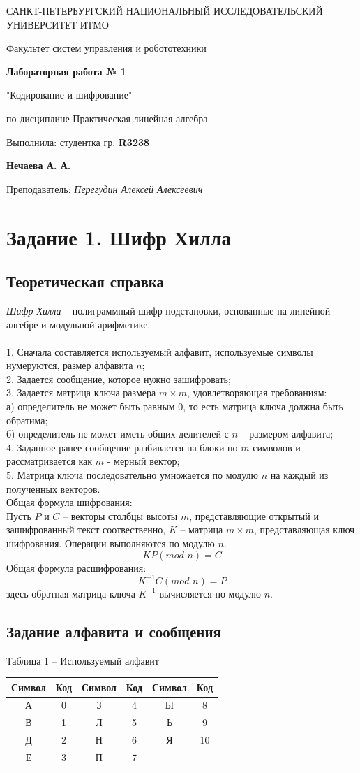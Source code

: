 \documentclass[a5paper, 10pt]{article}
\theoremstyle{definition}
\theoremstyle{plain}
\theoremstyle{remark}
\newcommand*{\titlePage}{
	\thispagestyle{title}
	\begingroup
	\begin{center}
		\vspace*{6ex}
		
		{\small
			САНКТ-ПЕТЕРБУРГСКИЙ НАЦИОНАЛЬНЫЙ ИССЛЕДОВАТЕЛЬСКИЙ УНИВЕРСИТЕТ ИТМО	
		}
		
		\vspace*{2ex}
		
		{\normalsize
			Факультет систем управления и робототехники
		}
		
		\vspace*{15ex}
		
		{\Large \bfseries 
			Лабораторная работа № 1
		}
\vspace*{2ex}
	{\Large \bfseries 
			
"Кодирование и шифрование"
		}
\vspace*{2ex}
		
		{\normalsize
			по дисциплине Практическая линейная алгебра
		}

	\end{center}
	\vspace*{20ex}
	\begin{flushright}
		{\large 
			\underline{Выполнила}: студентка гр. \textbf{R3238}\\
			\begin{flushright}
				\textbf{Нечаева А. А.}\\
			\end{flushright}
		}
		
		\vspace*{5ex}
		
		{\large 
			\underline{Преподаватель}: \textit{Перегудин Алексей Алексеевич}
		}
	\end{flushright}	
	\newpage
	\setcounter{page}{1}
	\endgroup}
\begin{document}
	\titlePage
	\pagestyle{style}
\newpage

\section{Задание 1. Шифр Хилла}
\subsection{Теоретическая справка}
\textit{Шифр Хилла} -- полиграммный шифр подстановки, основанные на линейной алгебре и модульной арифметике.\\\\
1. Сначала составляется используемый алфавит, используемые символы нумеруются, размер алфавита $n$;\\
2. Задается сообщение, которое нужно зашифровать;\\
3. Задается матрица ключа размера $m \times m$, удовлетворяющая требованиям: \\
\indent    а) определитель не может быть равным 0, то есть матрица ключа должна быть обратима;\\
 \indent   б) определитель не может иметь общих делителей с $n$ -- размером алфавита;\\
4. Заданное ранее сообщение разбивается на блоки по $m$ символов и рассматривается как  $m$ - мерный вектор;\\
5. Матрица ключа последовательно умножается по модулю $n$ на каждый из полученных векторов.\\

Общая формула шифрования:\\
Пусть $P$ и $C$ -- векторы столбцы высоты $m$, представляющие открытый и зашифрованный текст соотвественно, $K$ -- матрица  $m \times m$, представляющая ключ шифрования. Операции выполняются по модулю $n$.
\begin{equation}
K P (mod \textit{ n}) = C
\end{equation}
Общая формула расшифрования:
\begin{equation}
K^{-1} C (mod \textit{ n}) = P
\end{equation}
здесь обратная матрица ключа $K^{-1}$ вычисляется по модулю  $n$.
\subsection{Задание алфавита и сообщения}



\begin{center}
Таблица 1 -- Используемый алфавит\\
\begin{tabular}{ |c|c|c|c|c|c| } 
 \hline
Символ & Код & Символ & Код & Символ & Код\\
\hline
А & 0 & З  & 4 & Ы  & 8 \\
 \hline
В & 1 & Л & 5& Ь  & 9  \\
 \hline
Д & 2 & Н & 6& Я  & 10  \\
 \hline
Е & 3 & П & 7&   &   \\
 \hline
\end{tabular}
\end{center}
\end{document}
